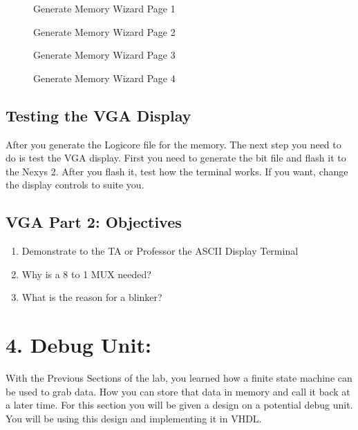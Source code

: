 \documentclass{article}
\begin{document}
\begin{figure}[!htbp]
  \centering
  \caption{Generate Memory Wizard Page 1}
\end{figure}

\begin{figure}[!htbp]
  \centering
  \caption{Generate Memory Wizard Page 2}
\end{figure}

\begin{figure}[!htbp]
  \centering
  \caption{Generate Memory Wizard Page 3}
\end{figure}

\begin{figure}[!htbp]
  \centering
  \caption{Generate Memory Wizard Page 4}
\end{figure}

\newpage
\subsection{Testing the VGA Display}
After you generate the Logicore file for the memory. The next step you need to do is test the VGA display. First you need to generate the bit file and flash it to the Nexys 2. After you flash it, test how the terminal works. If you want, change the display controls to suite you.

\subsection{VGA Part 2: Objectives}

\begin{enumerate}
  \item Demonstrate to the TA or Professor the ASCII Display Terminal
  \item Why is a 8 to 1 MUX needed?
  \item What is the reason for a blinker?
\end{enumerate}

\newpage

\section{4. Debug Unit:}
With the Previous Sections of the lab, you learned how a finite state machine can be used to grab data. How you can store that data in memory and call it back at a later time. For this section you will be given a design on a potential debug unit. You will be using this design and implementing it in VHDL.
\end{document}
